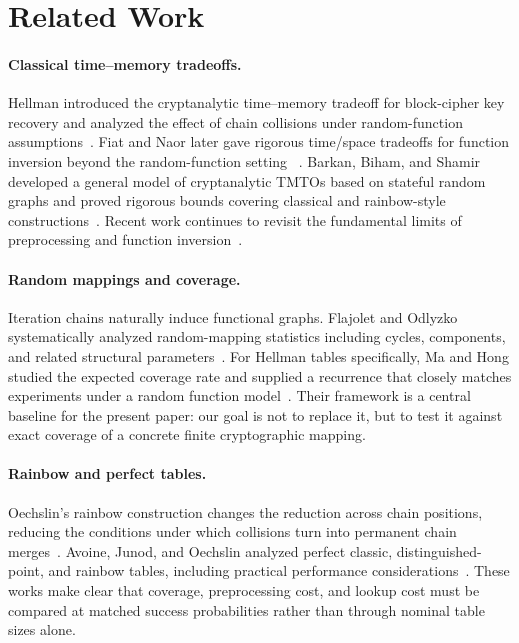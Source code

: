 \section{Related Work}

\paragraph{Classical time--memory tradeoffs.}
Hellman introduced the cryptanalytic time--memory tradeoff for block-cipher key
recovery and analyzed the effect of chain collisions under random-function
assumptions~\cite{Hellman1980}.  Fiat and Naor later gave rigorous time/space
tradeoffs for function inversion beyond the random-function setting
~\cite{FiatNaor1991}.  Barkan, Biham, and Shamir developed a general model of
cryptanalytic TMTOs based on stateful random graphs and proved rigorous bounds
covering classical and rainbow-style constructions~\cite{BarkanBihamShamir2006}.
Recent work continues to revisit the fundamental limits of preprocessing and
function inversion~\cite{GolovnevEtAl2023}.

\paragraph{Random mappings and coverage.}
Iteration chains naturally induce functional graphs.  Flajolet and Odlyzko
systematically analyzed random-mapping statistics including cycles,
components, and related structural parameters~\cite{FlajoletOdlyzko1990}.
For Hellman tables specifically, Ma and Hong studied the expected coverage
rate and supplied a recurrence that closely matches experiments under a random
function model~\cite{MaHong2009}.  Their framework is a central baseline for
the present paper: our goal is not to replace it, but to test it against exact
coverage of a concrete finite cryptographic mapping.

\paragraph{Rainbow and perfect tables.}
Oechslin's rainbow construction changes the reduction across chain positions,
reducing the conditions under which collisions turn into permanent chain
merges~\cite{Oechslin2003}.  Avoine, Junod, and Oechslin analyzed perfect
classic, distinguished-point, and rainbow tables, including practical
performance considerations~\cite{AvoineJunodOechslin2008}.  These works make
clear that coverage, preprocessing cost, and lookup cost must be compared at
matched success probabilities rather than through nominal table sizes alone.

